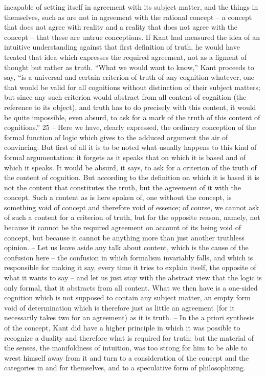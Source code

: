 incapable of setting itself in agreement with its subject matter, and the things
in themselves, such as are not in agreement with the rational concept – a
concept that does not agree with reality and a reality that does not agree
with the concept – that these are untrue conceptions. If Kant had measured
the idea of an intuitive understanding against that first definition of truth,
he would have treated that idea which expresses the required agreement,
not as a figment of thought but rather as truth.
“What we would want to know,” Kant proceeds to say, “is a universal
and certain criterion of truth of any cognition whatever, one that would be
valid for all cognitions without distinction of their subject matters; but since
any such criterion would abstract from all content of cognition (the reference
to its object), and truth has to do precisely with this content, it would be quite
impossible, even absurd, to ask for a mark of the truth of this content of
cognitions.” 25 – Here we have, clearly expressed, the ordinary conception
of the formal function of logic which gives to the adduced argument the air
of convincing. But first of all it is to be noted what usually happens to this
kind of formal argumentation: it forgets as it speaks that on which it is based
and of which it speaks. It would be absurd, it says, to ask for a criterion
of the truth of the content of cognition. But according to the definition on
which it is based it is not the content that constitutes the truth, but the
agreement of it with the concept. Such a content as is here spoken of, one
without the concept, is something void of concept and therefore void of
essence; of course, we cannot ask of such a content for a criterion of truth,
but for the opposite reason, namely, not because it cannot be the required
agreement on account of its being void of concept, but because it cannot
be anything more than just another truthless opinion. – Let us leave aside
any talk about content, which is the cause of the confusion here – the
confusion in which formalism invariably falls, and which is responsible for
making it say, every time it tries to explain itself, the opposite of what it
wants to say – and let us just stay with the abstract view that the logic
is only formal, that it abstracts from all content. What we then have is a
one-sided cognition which is not supposed to contain any subject matter,
an empty form void of determination which is therefore just as little an
agreement (for it necessarily takes two for an agreement) as it is truth. –
In the a priori synthesis of the concept, Kant did have a higher principle in
which it was possible to recognize a duality and therefore what is required
for truth; but the material of the senses, the manifoldness of intuition, was
too strong for him to be able to wrest himself away from it and turn to a
consideration of the concept and the categories in and for themselves, and
to a speculative form of philosophizing.

